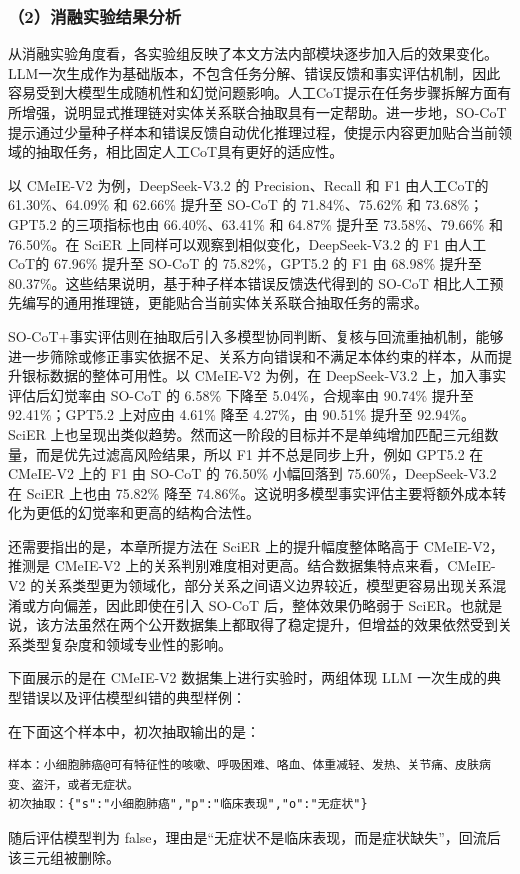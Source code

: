 \subsubsection*{（2）消融实验结果分析}

从消融实验角度看，各实验组反映了本文方法内部模块逐步加入后的效果变化。LLM一次生成作为基础版本，不包含任务分解、错误反馈和事实评估机制，因此容易受到大模型生成随机性和幻觉问题影响。人工CoT提示在任务步骤拆解方面有所增强，说明显式推理链对实体关系联合抽取具有一定帮助。进一步地，SO-CoT提示通过少量种子样本和错误反馈自动优化推理过程，使提示内容更加贴合当前领域的抽取任务，相比固定人工CoT具有更好的适应性。

以 CMeIE-V2 为例，DeepSeek-V3.2 的 Precision、Recall 和 F1 由人工CoT的 61.30\%、64.09\% 和 62.66\% 提升至 SO-CoT 的 71.84\%、75.62\% 和 73.68\%；GPT5.2 的三项指标也由 66.40\%、63.41\% 和 64.87\% 提升至 73.58\%、79.66\% 和 76.50\%。在 SciER 上同样可以观察到相似变化，DeepSeek-V3.2 的 F1 由人工CoT的 67.96\% 提升至 SO-CoT 的 75.82\%，GPT5.2 的 F1 由 68.98\% 提升至 80.37\%。这些结果说明，基于种子样本错误反馈迭代得到的 SO-CoT 相比人工预先编写的通用推理链，更能贴合当前实体关系联合抽取任务的需求。

SO-CoT+事实评估则在抽取后引入多模型协同判断、复核与回流重抽机制，能够进一步筛除或修正事实依据不足、关系方向错误和不满足本体约束的样本，从而提升银标数据的整体可用性。以 CMeIE-V2 为例，在 DeepSeek-V3.2 上，加入事实评估后幻觉率由 SO-CoT 的 6.58\% 下降至 5.04\%，合规率由 90.74\% 提升至 92.41\%；GPT5.2 上对应由 4.61\% 降至 4.27\%，由 90.51\% 提升至 92.94\%。SciER 上也呈现出类似趋势。然而这一阶段的目标并不是单纯增加匹配三元组数量，而是优先过滤高风险结果，所以 F1 并不总是同步上升，例如 GPT5.2 在 CMeIE-V2 上的 F1 由 SO-CoT 的 76.50\% 小幅回落到 75.60\%，DeepSeek-V3.2 在 SciER 上也由 75.82\% 降至 74.86\%。这说明多模型事实评估主要将额外成本转化为更低的幻觉率和更高的结构合法性。

还需要指出的是，本章所提方法在 SciER 上的提升幅度整体略高于 CMeIE-V2，推测是 CMeIE-V2 上的关系判别难度相对更高。结合数据集特点来看，CMeIE-V2 的关系类型更为领域化，部分关系之间语义边界较近，模型更容易出现关系混淆或方向偏差，因此即使在引入 SO-CoT 后，整体效果仍略弱于 SciER。也就是说，该方法虽然在两个公开数据集上都取得了稳定提升，但增益的效果依然受到关系类型复杂度和领域专业性的影响。

下面展示的是在 CMeIE-V2 数据集上进行实验时，两组体现 LLM 一次生成的典型错误以及评估模型纠错的典型样例：

在下面这个样本中，初次抽取输出的是：
\begin{lstlisting}[style=promptbox]
样本：小细胞肺癌@可有特征性的咳嗽、呼吸困难、咯血、体重减轻、发热、关节痛、皮肤病变、盗汗，或者无症状。
初次抽取：{"s":"小细胞肺癌","p":"临床表现","o":"无症状"}
\end{lstlisting}
随后评估模型判为 false，理由是“无症状不是临床表现，而是症状缺失”，回流后该三元组被删除。


